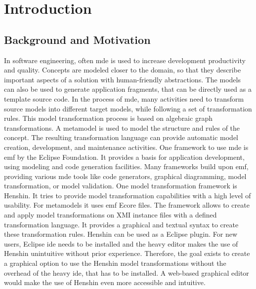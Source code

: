 \chapter{Introduction}
\label{sec:introduction}

\section{Background and Motivation}
\label{subsec:motivation}

In software engineering, often \ac{mde} is used to increase development productivity and quality. \cite{transformations-modeldriven} Concepts are modeled closer to the domain, so that they describe important aspects of a solution with human-friendly abstractions. The models can also be used to generate application fragments, that can be directly used as a template source code. In the process of \ac{mde}, many activities need to transform source models into different target models, while following a set of transformation rules. This model transformation process is based on algebraic graph transformations. A metamodel is used to model the structure and rules of the concept. The resulting transformation language can provide automatic model creation, development, and maintenance activities. \cite{transformations-modeldriven} One framework to use \ac{mde} is \ac{emf} by the Eclipse Foundation. It provides a basis for application development, using modeling and code generation facilities. Many frameworks build upon \ac{emf}, providing various \ac{mde} tools like code generators, graphical diagramming, model transformation, or model validation. \cite{emf} One model transformation framework is Henshin. \cite{henshin-repo} It tries to provide model transformation capabilities with a high level of usability. \cite{henshin-usability} For metamodels it uses \ac{emf} Ecore files. The framework allows to create and apply model transformations on XMI instance files with a defined transformation language. It provides a graphical and textual syntax to create these transformation rules. \cite{henshin-repo} Henshin can be used as a Eclipse plugin. For new users, Eclipse \acs{ide} needs to be installed and the heavy editor makes the use of Henshin unintuitive without prior experience.
Therefore, the goal exists to create a graphical option to use the Henshin model transformations without the overhead of the heavy \acs{ide}, that has to be installed. A web-based graphical editor would make the use of Henshin even more accessible and intuitive.

